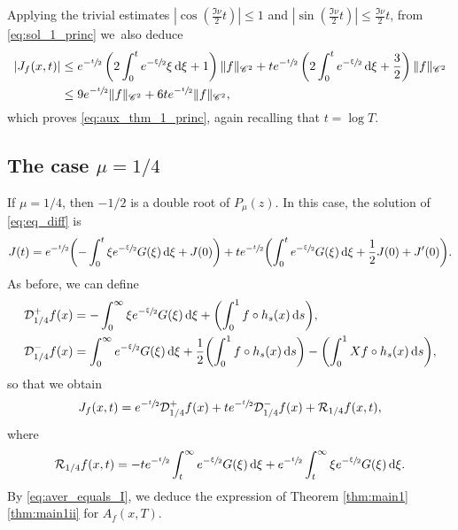 \documentclass[11pt]{article}
\newcommand*{\diff}{\mathop{}\!\mathrm{d}}
\newcommand{\aver}[1]{A_{#1}(x,T)}
\theoremstyle{definition}
\begin{document}
Applying the trivial estimates $|\cos(\frac{\Im\nu}{2} t)|\leq 1$ and $|\sin(\frac{\Im\nu}{2} t)|\leq \frac{\Im\nu}{2} t$, from \eqref{eq:sol_1_princ} we~also deduce
\begin{equation*}
\begin{split}
|J_f(x,t)|&\leq e^{-\sfrac{t}{2}} \left(2 \int_0^t e^{-\sfrac{\xi}{2}} \xi \diff \xi +1\right) \|f\|_{\mathscr{C}^2} + t e^{-\sfrac{t}{2}} \left(2 \int_0^t e^{-\sfrac{\xi}{2}} \diff \xi +\frac{3}{2}\right) \|f\|_{\mathscr{C}^2}\\
& \leq 9 e^{-\sfrac{t}{2}} \|f\|_{\mathscr{C}^2} + 6t e^{-\sfrac{t}{2}} \|f\|_{\mathscr{C}^2},
\end{split}
\end{equation*}
which proves \eqref{eq:aux_thm_1_princ}, again recalling that $t = \log T$.

\subsection{The case $\mu = 1/4$}\label{sec:14}

If $\mu = 1/4$, then $-1/2$ is a double root of $P_\mu(z)$. In this case, the solution of \eqref{eq:eq_diff} is
\begin{equation*}
J(t) = e^{-\sfrac{t}{2}} \biggl(- \int_0^t \xi e^{-\sfrac{\xi}{2}} G(\xi) \diff \xi + J(0) \biggr) + t e^{-\sfrac{t}{2}} \biggl(\int_0^t e^{-\sfrac{\xi}{2}} G(\xi) \diff \xi + \frac{1}{2} J(0) + J'(0) \biggr).
\end{equation*}
As before, we can define
\begin{equation*}
\begin{split}
&\mathcal{D}_{1/4}^{+}f(x) = - \int_0^\infty \xi e^{-\sfrac{\xi}{2}} G(\xi) \diff \xi + \biggl(\int_0^1 f \circ h_s(x) \diff s \biggr),\\
&\mathcal{D}_{1/4}^{-}f(x) = \int_0^\infty e^{-\sfrac{\xi}{2}} G(\xi) \diff \xi + \frac{1}{2} \biggl(\int_0^1 f \circ h_s(x) \diff s \biggr) - \biggl(\int_0^1 Xf \circ h_s(x) \diff s \biggr),
\end{split}
\end{equation*}
so that we obtain
\begin{equation}\label{eq:I_mu_14}
J_{f}(x,t) = e^{-\sfrac{t}{2}} \mathcal{D}_{1/4}^{+}f(x) + t e^{-\sfrac{t}{2}} \mathcal{D}_{1/4}^{-}f(x) + \mathcal{R}_{1/4}f(x,t),
\end{equation}
where
\[
\mathcal{R}_{1/4}f(x,t) = - t e^{-\sfrac{t}{2}} \int_t^{\infty} e^{-\sfrac{\xi}{2}} G(\xi) \diff \xi + e^{-\sfrac{t}{2}} \int_t^{\infty} \xi e^{-\sfrac{\xi}{2}} G(\xi) \diff \xi.
\]
By \eqref{eq:aver_equals_I}, we deduce the expression of Theorem \ref{thm:main1}\eqref{thm:main1ii} for $\aver{f}$.
\end{document}
